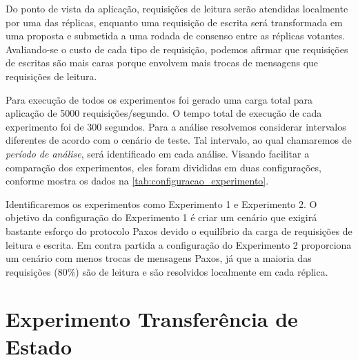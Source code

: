 Do ponto de vista da aplicação, requisições de leitura serão atendidas localmente por uma
das réplicas, enquanto uma requisição de escrita será transformada em uma proposta e
submetida a uma rodada de consenso entre as réplicas votantes. Avaliando-se o custo de
cada tipo de requisição, podemos afirmar que requisições de escritas são mais caras porque
envolvem mais trocas de mensagens que requisições de leitura.

Para execução de todos os experimentos foi gerado uma carga total para aplicação de 5000
requisições/segundo. O tempo total de execução de cada experimento foi de 300 segundos.
Para a análise resolvemos considerar intervalos diferentes de acordo com o cenário de
teste. Tal intervalo, ao qual chamaremos de \emph{período de análise}, será identificado
em cada análise. Visando facilitar a comparação dos experimentos, eles foram divididas em
duas configurações, conforme mostra os dados na \autoref{tab:configuracao_experimento}.

\begin{table}[htb]
\end{table}

Identificaremos os experimentos como Experimento 1 e Experimento 2. O objetivo da
configuração do Experimento 1 é criar um cenário que exigirá bastante esforço do protocolo
Paxos devido o equilíbrio da carga de requisições de leitura e escrita. Em contra partida
a configuração do Experimento 2 proporciona um cenário com menos trocas de mensagens
Paxos, já que a maioria das requisições (80\%) são de leitura e são resolvidos localmente
em cada réplica.


\section{Experimento Transferência de Estado}\label{sec:experimento_tranferencia_estado}

